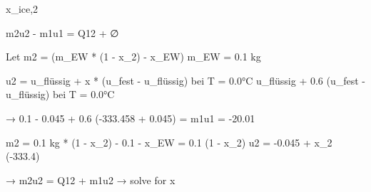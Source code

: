 x_ice,2  

m2u2 - m1u1 = Q12 + ∅  

Let m2 = (m_EW * (1 - x_2) - x_EW)  
m_EW = 0.1 kg  

u2 = u_flüssig + x * (u_fest - u_flüssig) bei T = 0.0°C  
u_flüssig + 0.6 (u_fest - u_flüssig) bei T = 0.0°C  

→ 0.1 - 0.045 + 0.6 (-333.458 + 0.045) = m1u1  
= -20.01  

m2 = 0.1 kg * (1 - x_2) - 0.1 - x_EW = 0.1 (1 - x_2)  
u2 = -0.045 + x_2 (-333.4)  

→ m2u2 = Q12 + m1u2 → solve for x